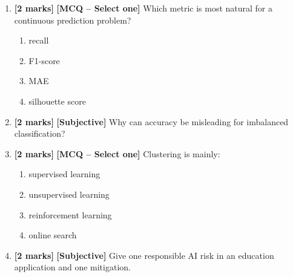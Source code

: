 \documentclass[11pt,a4paper]{article}
\newcommand{\EMarks}{\textbf{[2 marks]} }
\begin{document}
\begin{enumerate}[label=\textbf{E\arabic*.}, leftmargin=*]
  \item \EMarks \textbf{[MCQ -- Select one]} Which metric is most natural for a continuous prediction problem?
    \begin{enumerate}[label=(\Alph*), leftmargin=*]
      \item recall
      \item F1-score
      \item MAE
      \item silhouette score
    \end{enumerate}

  \item \EMarks \textbf{[Subjective]} Why can accuracy be misleading for imbalanced classification?

  \item \EMarks \textbf{[MCQ -- Select one]} Clustering is mainly:
    \begin{enumerate}[label=(\Alph*), leftmargin=*]
      \item supervised learning
      \item unsupervised learning
      \item reinforcement learning
      \item online search
    \end{enumerate}

  \item \EMarks \textbf{[Subjective]} Give one responsible AI risk in an education application and one mitigation.
\end{enumerate}
\end{document}
